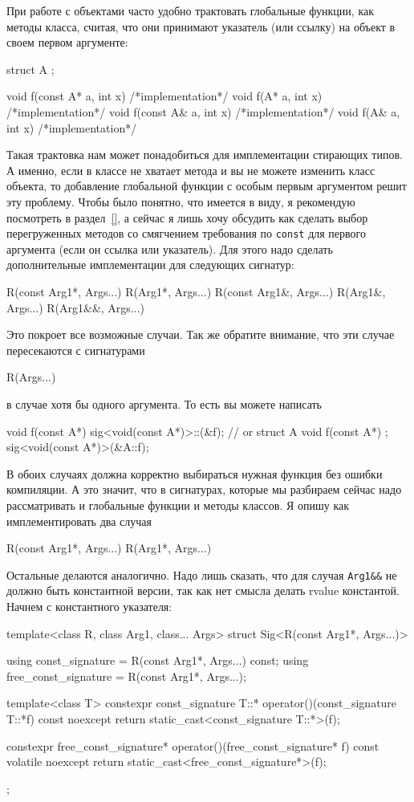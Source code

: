 При работе с объектами часто удобно трактовать глобальные функции, как методы класса, считая, что они принимают указатель (или ссылку) на объект в своем первом аргументе:
\begin{cppcode}
struct A {};

void f(const A* a, int x) { /*implementation*/ }
void f(A* a, int x) { /*implementation*/ }
void f(const A& a, int x) { /*implementation*/ }
void f(A& a, int x) { /*implementation*/ }
\end{cppcode}
Такая трактовка нам может понадобиться для имплементации стирающих типов.
А именно, если в классе не хватает метода и вы не можете изменить класс объекта, то добавление глобальной функции с особым первым аргументом решит эту проблему.
Чтобы было понятно, что имеется в виду, я рекомендую посмотреть в раздел~\ref{}, а сейчас я лишь хочу обсудить как сделать выбор перегруженных методов со смягчением требования по \verb"const" для первого аргумента (если он ссылка или указатель).
Для этого надо сделать дополнительные имплементации для следующих сигнатур:
\begin{cppcode}[numbers = none]
R(const Arg1*, Args...)
R(Arg1*, Args...)
R(const Arg1&, Args...)
R(Arg1&, Args...)
R(Arg1&&, Args...)
\end{cppcode}
Это покроет все возможные случаи.
Так же обратите внимание, что эти случае пересекаются с сигнатурами
\begin{cppcode}[numbers = none]
R(Args...)
\end{cppcode}
в случае хотя бы одного аргумента.
То есть вы можете написать
\begin{cppcode}[numbers = none]
void f(const A*) {}
sig<void(const A*)>::(&f);
// or
struct A {
  void f(const A*) {}
};
sig<void(const A*)>(&A::f);
\end{cppcode}
В обоих случаях должна корректно выбираться нужная функция без ошибки компиляции.
А это значит, что в сигнатурах, которые мы разбираем сейчас надо рассматривать и глобальные функции и методы классов.
Я опишу как имплементировать два случая
\begin{cppcode}[numbers = none]
R(const Arg1*, Args...)
R(Arg1*, Args...)
\end{cppcode}
Остальные делаются аналогично.
Надо лишь сказать, что для случая \verb"Arg1&&" не должно быть константной версии, так как нет смысла делать rvalue константой.
Начнем с константного указателя:
\begin{cppcode}

template<class R, class Arg1, class... Args>
struct Sig<R(const Arg1*, Args...)> {
  using const_signature = R(const Arg1*, Args...) const;
  using free_const_signature = R(const Arg1*, Args...);

  template<class T>
  constexpr const_signature T::*
  operator()(const_signature T::*f) const noexcept {
    return static_cast<const_signature T::*>(f);
  }

  constexpr free_const_signature* operator()(free_const_signature* f) const volatile noexcept {
    return static_cast<free_const_signature*>(f);
  }
};
\end{cppcode}
